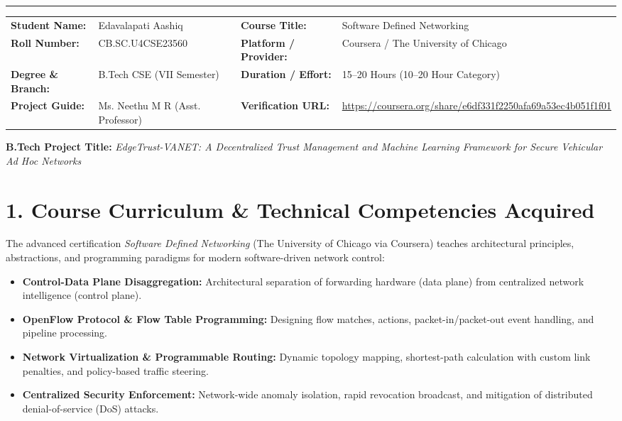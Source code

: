 \documentclass[10pt,a4paper]{article}
\begin{document}
\vspace{-4pt}
\hrule height 0.8pt
\vspace{4pt}

\noindent
\begin{tabularx}{\textwidth}{@{}l X l X@{}}
    \textbf{Student Name:} & Edavalapati Aashiq & \textbf{Course Title:} & Software Defined Networking \\
    \textbf{Roll Number:} & CB.SC.U4CSE23560 & \textbf{Platform / Provider:} & Coursera / The University of Chicago \\
    \textbf{Degree \& Branch:} & B.Tech CSE (VII Semester) & \textbf{Duration / Effort:} & 15--20 Hours (10--20 Hour Category) \\
    \textbf{Project Guide:} & Ms. Neethu M R (Asst. Professor) & \textbf{Verification URL:} & \url{https://coursera.org/share/e6df331f2250afa69a53ec4b051f1f01} \\
\end{tabularx}

\vspace{3pt}
\noindent
\textbf{B.Tech Project Title:} \textit{EdgeTrust-VANET: A Decentralized Trust Management and Machine Learning Framework for Secure Vehicular Ad Hoc Networks}

\vspace{2pt}
\section*{1. Course Curriculum \& Technical Competencies Acquired}
The advanced certification \textit{Software Defined Networking} (The University of Chicago via Coursera) teaches architectural principles, abstractions, and programming paradigms for modern software-driven network control:
\begin{itemize}
    \item \textbf{Control-Data Plane Disaggregation:} Architectural separation of forwarding hardware (data plane) from centralized network intelligence (control plane).
    \item \textbf{OpenFlow Protocol \& Flow Table Programming:} Designing flow matches, actions, packet-in/packet-out event handling, and pipeline processing.
    \item \textbf{Network Virtualization \& Programmable Routing:} Dynamic topology mapping, shortest-path calculation with custom link penalties, and policy-based traffic steering.
    \item \textbf{Centralized Security Enforcement:} Network-wide anomaly isolation, rapid revocation broadcast, and mitigation of distributed denial-of-service (DoS) attacks.
\end{itemize}
\end{document}
